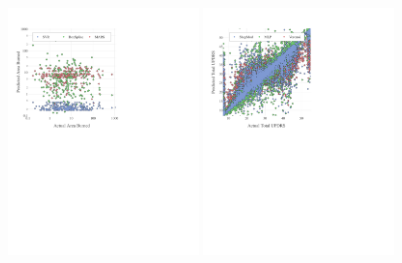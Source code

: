 \documentclass[singlespace,nopageskip]{VTthesis} %
\begin{document}
\begin{appendices}
\begin{normalsize}
\end{normalsize}

\begin{figure}[h]
  \centering
  \includegraphics[width=0.45\textwidth,]{Figures/NA/scatter_forestfires.pdf}
  \hspace{.6cm}
  \includegraphics[width=0.45\textwidth,]{Figures/NA/scatter_parkinsons.pdf}
  \vspace{.6cm}


\end{figure}
\end{appendices}
\end{document}
